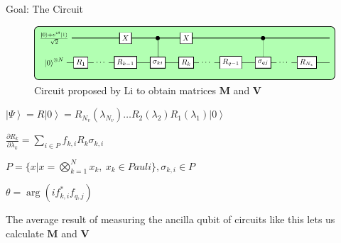 \documentclass[professionalfonts]{beamer}
\newcommand{\ket}[1]{\ensuremath{\left|#1\right\rangle}}
\newcommand{\paren}[1]{\left( #1 \right)}
\newcommand{\fpd}[2]{\frac{\partial #1}{\partial #2}}
\newcommand{\SubItem}[1]{
    {\setlength\itemindent{15pt} \item[*] #1}
}
\begin{document}
\begin{frame}{Goal: The Circuit}
\begin{figure}[ht!]
\includegraphics[width=\linewidth]{../circuits/circuit2}
\caption{Circuit proposed by Li \citep{benjamin} to obtain matrices $\bm M$ and $\bm V$}
\end{figure}
	\begin{itemize}
		\item{$\ket \Psi = R \ket 0 = 
			R_{N_v}(\lambda_{N_v}) 
			\ldots
			R_2(\lambda_2) 
			R_1(\lambda_1) \ket 0
		$ }
	\item{\(
				\fpd{R_k}{\lambda_k} = \sum_{i \in P} f_{k, i} R_k \sigma_{k, i}
			\)}
			\SubItem{
			$P = \{x \vert x = \bigotimes_{k = 1}^{N} x_k,\ x_k \in Pauli\}, \sigma_{k, i} \in P$}
		\item $\theta = \arg \paren{if_{k, i}^*f_{q, j}}$
		\item The average result of measuring the ancilla qubit of circuits like this lets us calculate $\bm M$ and $\bm V$
	\end{itemize}
\end{frame}

\end{document}
